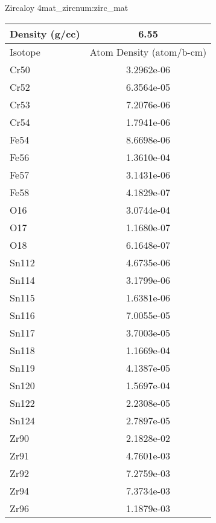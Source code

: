 \begin{matitem}{Zircaloy 4}{mat_zirc}{num:zirc_mat}
  \centering
  \begin{tabular}{l c}
    \toprule
    Density (g/cc) & 6.55 \\
    \midrule
    Isotope & Atom Density (atom/b-cm) \\
    \midrule
    \midrule
Cr50 & 3.2962e-06 \\
Cr52 & 6.3564e-05 \\
Cr53 & 7.2076e-06 \\
Cr54 & 1.7941e-06 \\
Fe54 & 8.6698e-06 \\
Fe56 & 1.3610e-04 \\
Fe57 & 3.1431e-06 \\
Fe58 & 4.1829e-07 \\
O16 & 3.0744e-04 \\
O17 & 1.1680e-07 \\
O18 & 6.1648e-07 \\
Sn112 & 4.6735e-06 \\
Sn114 & 3.1799e-06 \\
Sn115 & 1.6381e-06 \\
Sn116 & 7.0055e-05 \\
Sn117 & 3.7003e-05 \\
Sn118 & 1.1669e-04 \\
Sn119 & 4.1387e-05 \\
Sn120 & 1.5697e-04 \\
Sn122 & 2.2308e-05 \\
Sn124 & 2.7897e-05 \\
Zr90 & 2.1828e-02 \\
Zr91 & 4.7601e-03 \\
Zr92 & 7.2759e-03 \\
Zr94 & 7.3734e-03 \\
Zr96 & 1.1879e-03 \\

    \bottomrule
  \end{tabular}
\end{matitem}
